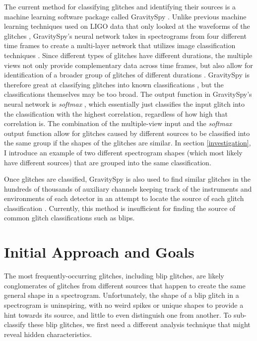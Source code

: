 \documentclass[a4paper]{article}
\begin{document}
The current method for classifying glitches and identifying their sources is a machine learning software package called GravitySpy \cite{Zevin:2016}. Unlike previous machine learning techniques used on LIGO data that only looked at the waveforms of the glitches \cite{Mukherjee:2010}, GravitySpy's neural network takes in spectrograms from four different time frames to create a multi-layer network that utilizes image classification techniques \cite{Bahaadini:2017}. Since different types of glitches have different durations, the multiple views not only provide complementary data across time frames, but also allow for identification of a broader group of glitches of different durations \cite{Bahaadini:2017}. GravitySpy is therefore great at classifying glitches into known classifications \cite{Zevin:2016}, but the classifications themselves may be too broad. The output function in GravitySpy's neural network is \textit{softmax} \cite{Bahaadini:2017}, which essentially just classifies the input glitch into the classification with the highest correlation, regardless of how high that correlation is. The combination of the multiple-view input and the \textit{softmax} output function allow for glitches caused by different sources to be classified into the same group if the shapes of the glitches are similar. In section \ref{investigation}, I introduce an example of two different spectrogram shapes (which most likely have different sources) that are grouped into the same classification. 

Once glitches are classified, GravitySpy is also used to find similar glitches in the hundreds of thousands of auxiliary channels keeping track of the instruments and environments of each detector in an attempt to locate the source of each glitch classification \cite{Zevin:2016}. Currently, this method is insufficient for finding the source of common glitch classifications such as blips.

\section{Initial Approach and Goals} \label{goal}

The most frequently-occurring glitches, including blip glitches, are likely conglomerates of glitches from different sources that happen to create the same general shape in a spectrogram. Unfortunately, the shape of a blip glitch in a spectrogram is uninspiring, with no weird spikes or unique shapes to provide a hint towards its source, and little to even distinguish one from another. To sub-classify these blip glitches, we first need a different analysis technique that might reveal hidden characteristics. 
\end{document}
